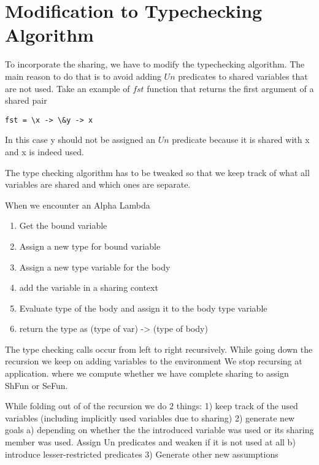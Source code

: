 
\section{Modification to Typechecking Algorithm}

To incorporate the sharing, we have to modify the typechecking algorithm.
The main reason to do that is to avoid adding $Un$ predicates to
shared variables that are not used. Take an example of $fst$ function
that returns the first argument of a shared pair
\begin{verbatim}
fst = \x -> \&y -> x
\end{verbatim}
In this case y should not be assigned an $Un$ predicate because
it is shared with x and x is indeed used.

The type checking algorithm has to be tweaked so that we keep track
of what all variables are shared and which ones are separate.

When we encounter an Alpha Lambda
\begin{enumerate}
\item Get the bound variable
\item Assign a new type for bound variable
\item Assign a new type variable for the body
\item add the variable in a sharing context
\item Evaluate type of the body and assign it to the body type variable
\item return the type as (type of var) -> (type of body)
\end{enumerate}



The type checking calls occur from left to right recursively.
While going down the recursion we keep on adding variables to the environment
We stop recursing at application. where we compute whether we have complete sharing to assign ShFun or SeFun.

While folding out of of the recursion we do 2 things:
1) keep track of the used variables (including implicitly used variables due to sharing)
2) generate new goals
a) depending on whether the the introduced variable was used
or its sharing member was used. Assign Un predicates and weaken if it is not used at all
b) introduce lesser-restricted predicates
3) Generate other new assumptions

